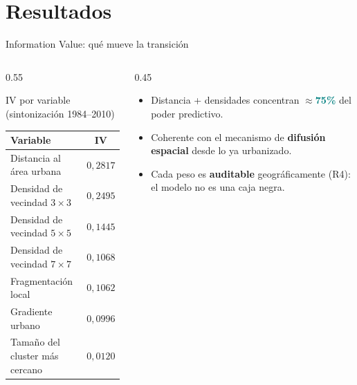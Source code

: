 \documentclass[aspectratio=169,11pt]{beamer}
\newcommand{\highlight}[1]{\textcolor{UNAMBlue}{\textbf{#1}}}
\newcommand{\keynum}[1]{\textcolor{Teal}{\textbf{#1}}}
\begin{document}
\section{Resultados}

\begin{frame}{Information Value: qué mueve la transición}
  \begin{columns}[T]
    \begin{column}{0.55\textwidth}
      \scriptsize
      \begin{block}{IV por variable (sintonización 1984--2010)}
      \begin{tabular}{lc}
        \toprule
        \textbf{Variable} & \textbf{IV} \\
        \midrule
        Distancia al área urbana          & $0{,}2817$ \\
        Densidad de vecindad $3\times3$    & $0{,}2495$ \\
        Densidad de vecindad $5\times5$    & $0{,}1445$ \\
        Densidad de vecindad $7\times7$    & $0{,}1068$ \\
        Fragmentación local               & $0{,}1062$ \\
        Gradiente urbano                  & $0{,}0996$ \\
        Tamaño del cluster más cercano    & $0{,}0120$ \\
        \bottomrule
      \end{tabular}
      \end{block}
    \end{column}
    \begin{column}{0.45\textwidth}
      \small
      \begin{itemize}
        \item Distancia + densidades concentran $\approx$\keynum{75\%} del poder predictivo.
        \item Coherente con el mecanismo de \highlight{difusión espacial} desde lo ya urbanizado.
        \item Cada peso es \highlight{auditable} geográficamente (R4): el modelo no es una caja negra.
      \end{itemize}
    \end{column}
  \end{columns}
\end{frame}
\end{document}
